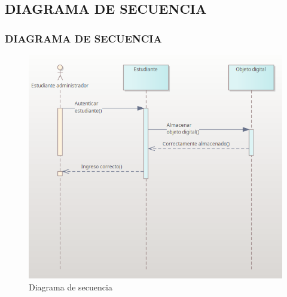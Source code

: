 \documentclass[article]{beamer}
\begin{document}




\subsection{DIAGRAMA DE SECUENCIA}
\begin{frame}[fragile]
\frametitle{DIAGRAMA DE SECUENCIA}
\begin{figure}[ht]
	\centering
	\includegraphics[scale=0.5]{images/secuencia1.png}
	\caption{Diagrama de secuencia}
\end{figure}
\end{frame}
\end{document}
